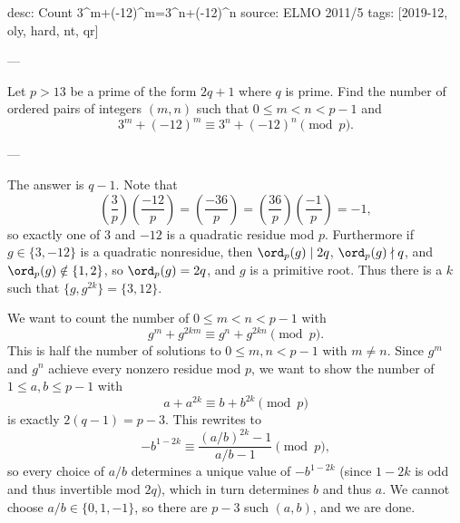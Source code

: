 desc: Count 3^m+(-12)^m=3^n+(-12)^n
source: ELMO 2011/5
tags: [2019-12, oly, hard, nt, qr]

---

Let $p>13$ be a prime of the form $2q+1$ where $q$ is prime. Find the number of ordered pairs of integers $(m,n)$ such that $0\le m<n<p-1$ and \[3^m+(-12)^m\equiv3^n+(-12)^n\pmod p.\]

---

The answer is $q-1$. Note that \[\left(\frac3p\right)\left(\frac{-12}p\right)=\left(\frac{-36}p\right)=\left(\frac{36}p\right)\left(\frac{-1}p\right)=-1,\]
so exactly one of $3$ and $-12$ is a quadratic residue mod $p$. Furthermore if $g\in\{3,-12\}$ is a quadratic nonresidue, then $\ord_p(g)\mid2q$, $\ord_p(g)\nmid q$, and $\ord_p(g)\notin\{1,2\}$, so $\ord_p(g)=2q$, and $g$ is a primitive root. Thus there is a $k$ such that $\{g,g^{2k}\}=\{3,12\}$.

We want to count the number of $0\le m<n<p-1$ with \[g^m+g^{2km}\equiv g^n+g^{2kn}\pmod p.\]
This is half the number of solutions to $0\le m,n<p-1$ with $m\ne n$. Since $g^m$ and $g^n$ achieve every nonzero residue mod $p$, we want to show the number of $1\le a,b\le p-1$ with \[a+a^{2k}\equiv b+b^{2k}\pmod p\]
is exactly $2(q-1)=p-3$. This rewrites to \[-b^{1-2k}\equiv\frac{(a/b)^{2k}-1}{a/b-1}\pmod p,\]
so every choice of $a/b$ determines a unique value of $-b^{1-2k}$ (since $1-2k$ is odd and thus invertible mod $2q$), which in turn determines $b$ and thus $a$. We cannot choose $a/b\in\{0,1,-1\}$, so there are $p-3$ such $(a,b)$, and we are done.
